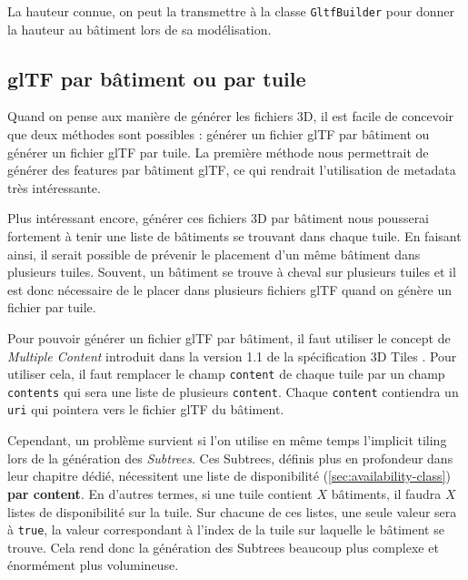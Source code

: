 La hauteur connue, on peut la transmettre à la classe \texttt{GltfBuilder} pour donner la hauteur au bâtiment lors de sa modélisation.

\subsection{glTF par bâtiment ou par tuile}

Quand on pense aux manière de générer les fichiers 3D, il est facile de concevoir que deux méthodes sont possibles : générer un fichier glTF par bâtiment ou générer un fichier glTF par tuile. La première méthode nous permettrait de générer des features par bâtiment glTF, ce qui rendrait l'utilisation de metadata très intéressante.

Plus intéressant encore, générer ces fichiers 3D par bâtiment nous pousserai fortement à tenir une liste de bâtiments se trouvant dans chaque tuile. En faisant ainsi, il serait possible de prévenir le placement d'un même bâtiment dans plusieurs tuiles. Souvent, un bâtiment se trouve à cheval sur plusieurs tuiles et il est donc nécessaire de le placer dans plusieurs fichiers glTF quand on génère un fichier par tuile.

Pour pouvoir générer un fichier glTF par bâtiment, il faut utiliser le concept de \textit{Multiple Content} introduit dans la version 1.1 de la spécification 3D Tiles \cite{3d-tiles-reference-card-v1_1}. Pour utiliser cela, il faut remplacer le champ \texttt{content} de chaque tuile par un champ \texttt{contents} qui sera une liste de plusieurs \texttt{content}. Chaque \texttt{content} contiendra un \texttt{uri} qui pointera vers le fichier glTF du bâtiment.

Cependant, un problème survient si l'on utilise en même temps l'implicit tiling lors de la génération des \textit{Subtrees}. Ces Subtrees, définis plus en profondeur dans leur chapitre dédié, nécessitent une liste de disponibilité (\autoref{sec:availability-class}) \textbf{par content}. En d'autres termes, si une tuile contient $X$ bâtiments, il faudra $X$ listes de disponibilité sur la tuile. Sur chacune de ces listes, une seule valeur sera à \texttt{true}, la valeur correspondant à l'index de la tuile sur laquelle le bâtiment se trouve. Cela rend donc la génération des Subtrees beaucoup plus complexe et énormément plus volumineuse.